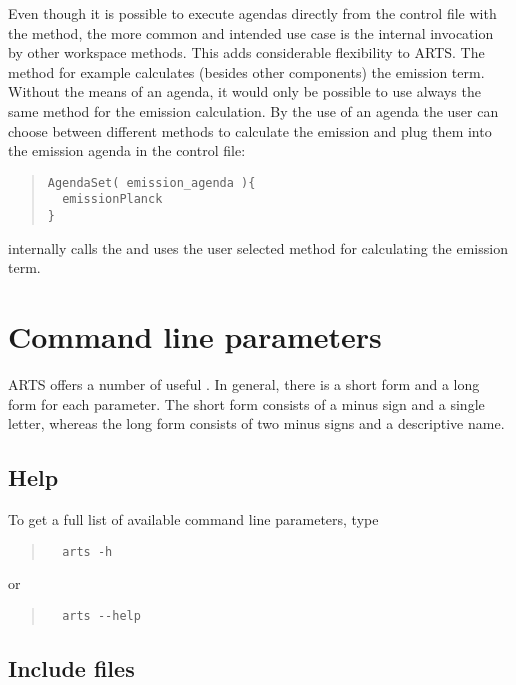 Even though it is possible to execute agendas directly from the
control file with the  method, the more
common and intended use case is the internal invocation by other
workspace methods. This adds considerable flexibility to ARTS. The
 method for example calculates (besides other
components) the emission term. Without the means of an agenda, it
would only be possible to use always the same method for the emission
calculation. By the use of an agenda the user can choose between
different methods to calculate the emission and plug them into the
emission agenda in the control file:

\begin{quote}
\begin{verbatim}
AgendaSet( emission_agenda ){
  emissionPlanck
}
\end{verbatim}
\end{quote}

\noindent
{} internally calls the  and
uses the user selected method for calculating the emission term.


\section{Command line parameters}
\label{sec:concept:comline}

ARTS offers a number of useful . In
general, there is a short form and a long form for each parameter. The
short form consists of a minus sign and a single letter, whereas the
long form consists of two minus signs and a descriptive name.

\subsection*{Help}

To get a full list of available command line parameters, type
\begin{quote}
\begin{verbatim}
  arts -h
\end{verbatim}
\end{quote}
or
\begin{quote}
\begin{verbatim}
  arts --help
\end{verbatim}
\end{quote}


\subsection*{Include files}

